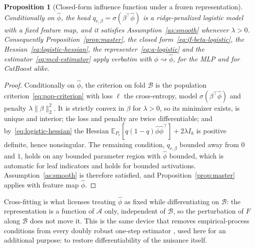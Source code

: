 \documentclass[11pt]{article}
\newtheorem{proposition}{Proposition}
\newcommand{\Eb}{\mathbb{E}}
\begin{document}
\begin{proposition}[Closed-form influence function under a frozen representation]
\label{prop:frozen}
Conditionally on $\hat\phi$, the head $q_{r,\beta}=\sigma(\beta^\top\hat\phi)$ is a
ridge-penalized logistic model with a fixed feature map, and it satisfies
Assumption~\ref{as:smooth} whenever $\lambda>0$. Consequently
Proposition~\ref{prop:master}, the closed form~\eqref{eq:if-beta-logistic}, the
Hessian~\eqref{eq:logistic-hessian}, the representer~\eqref{eq:a-logistic} and the
estimator~\eqref{eq:mcd-estimator} apply verbatim with
$\phi\rightsquigarrow\hat\phi$, for the MLP and for CatBoost alike.
\end{proposition}

\begin{proof}
Conditionally on $\hat\phi$, the criterion on fold $\mathcal{B}$ is the population
criterion~\eqref{eq:pop-criterion} with loss $\ell$ the cross-entropy, model
$\sigma(\beta^\top\hat\phi)$ and penalty $\lambda\|\beta\|_2^2$. It is strictly convex
in $\beta$ for $\lambda>0$, so its minimizer exists, is unique and interior; the loss
and penalty are twice differentiable; and by~\eqref{eq:logistic-hessian} the Hessian
$\Eb_{P_r}[q(1-q)\hat\phi\hat\phi^\top]+2\lambda I_k$ is positive definite, hence
nonsingular. The remaining condition, $q_{r,\beta}$ bounded away from $0$ and $1$,
holds on any bounded parameter region with $\hat\phi$ bounded, which is automatic for
leaf indicators and holds for bounded activations. Assumption~\ref{as:smooth} is
therefore satisfied, and Proposition~\ref{prop:master} applies with feature map
$\hat\phi$.
\end{proof}

Cross-fitting is what licenses treating $\hat\phi$ as fixed while differentiating on
$\mathcal{B}$: the representation is a function of $\mathcal{A}$ only, independent of
$\mathcal{B}$, so the perturbation of $F$ along $\mathcal{B}$ does not move it. This
is the same device that removes empirical-process conditions from every doubly robust
one-step estimator \citep{chernozhukov2018,kennedy2022review}, used here for an
additional purpose: to restore differentiability of the nuisance itself.
\end{document}

